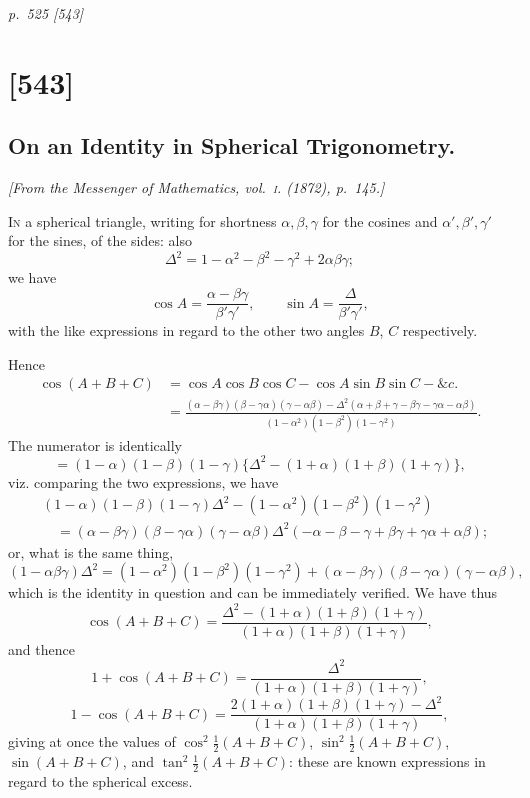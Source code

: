 \documentclass[11pt,a4paper]{article}
\theoremstyle{plain}
\theoremstyle{definition}
\newcommand{\sourcepage}[2]{%
  \bigskip
  \noindent\textit{p.~#1 [#2]}%
  \par\smallskip
}
\begin{document}
\clearpage

\sourcepage{525}{543}
\section{[543]}
\subsection{On an Identity in Spherical Trigonometry.}

\begin{center}
\textit{[From the Messenger of Mathematics, vol.~\textsc{i}. (1872), p.~145.]}
\end{center}

\textsc{In} a spherical triangle, writing for shortness $\alpha,\beta,\gamma$
for the cosines and $\alpha',\beta',\gamma'$ for the sines, of the sides:
also
\[
\Delta^2=1-\alpha^2-\beta^2-\gamma^2+2\alpha\beta\gamma;
\]
we have
\[
\cos A=\frac{\alpha-\beta\gamma}{\beta'\gamma'},\qquad
\sin A=\frac{\Delta}{\beta'\gamma'},
\]
with the like expressions in regard to the other two angles $B$, $C$
respectively.

Hence
\[
\begin{aligned}
\cos(A+B+C)
&=\cos A\cos B\cos C-\cos A\sin B\sin C-\&c.\\
&=\frac{(\alpha-\beta\gamma)(\beta-\gamma\alpha)(\gamma-\alpha\beta)
-\Delta^2(\alpha+\beta+\gamma-\beta\gamma-\gamma\alpha-\alpha\beta)}
{(1-\alpha^2)(1-\beta^2)(1-\gamma^2)}.
\end{aligned}
\]
The numerator is identically
\[
=(1-\alpha)(1-\beta)(1-\gamma)
\{\Delta^2-(1+\alpha)(1+\beta)(1+\gamma)\},
\]
viz. comparing the two expressions, we have
\[
\begin{aligned}
&(1-\alpha)(1-\beta)(1-\gamma)\Delta^2
 -(1-\alpha^2)(1-\beta^2)(1-\gamma^2)\\
&\quad=(\alpha-\beta\gamma)(\beta-\gamma\alpha)(\gamma-\alpha\beta)
\Delta^2(-\alpha-\beta-\gamma+\beta\gamma+\gamma\alpha+\alpha\beta);
\end{aligned}
\]
or, what is the same thing,
\[
(1-\alpha\beta\gamma)\Delta^2
=(1-\alpha^2)(1-\beta^2)(1-\gamma^2)
+(\alpha-\beta\gamma)(\beta-\gamma\alpha)(\gamma-\alpha\beta),
\]
which is the identity in question and can be immediately verified. We have
thus
\[
\cos(A+B+C)=
\frac{\Delta^2-(1+\alpha)(1+\beta)(1+\gamma)}
{(1+\alpha)(1+\beta)(1+\gamma)},
\]
and thence
\[
1+\cos(A+B+C)=
\frac{\Delta^2}{(1+\alpha)(1+\beta)(1+\gamma)},
\]
\[
1-\cos(A+B+C)=
\frac{2(1+\alpha)(1+\beta)(1+\gamma)-\Delta^2}
{(1+\alpha)(1+\beta)(1+\gamma)},
\]
giving at once the values of
$\cos^2\tfrac12(A+B+C)$, $\sin^2\tfrac12(A+B+C)$,
$\sin(A+B+C)$, and $\tan^2\tfrac12(A+B+C)$: these are known expressions
in regard to the spherical excess.
\end{document}
